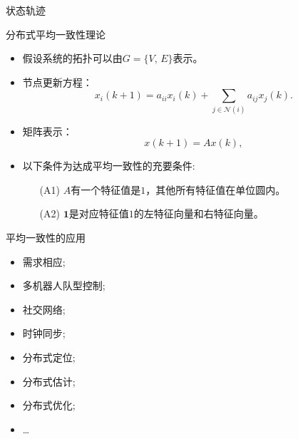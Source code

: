 \documentclass[10pt]{beamer}
\begin{document}
\begin{frame}{状态轨迹}
  \begin{figure}[ht]
    \centering
    
  \end{figure}
\end{frame}

\begin{frame}{分布式平均一致性理论}
  \begin{itemize}
  \item 假设系统的拓扑可以由$G = \{V,\,E\}$表示。
  \item 节点更新方程：
    \begin{displaymath}
      x_i(k+1) = a_{ii} x_{i}(k) + \sum_{j\in \mathcal N(i)} a_{ij} x_{j}(k).  
    \end{displaymath}
  \item 矩阵表示：
    \begin{displaymath}
      x(k+1) = A x(k),
    \end{displaymath}
  \item 以下条件为达成平均一致性的充要条件:
    \begin{enumerate}
    \item[(A1)] $A$有一个特征值是$1$，其他所有特征值在单位圆内。 
    \item[(A2)] $\mathbf 1$是对应特征值$1$的左特征向量和右特征向量。
    \end{enumerate}
  \end{itemize}
\end{frame}


\begin{frame}{平均一致性的应用}
  \begin{itemize}
  \item 需求相应;
  \item 多机器人队型控制;
  \item 社交网络;
  \item 时钟同步;
  \item 分布式定位;
  \item 分布式估计;
  \item 分布式优化;
  \item \dots
  \end{itemize}
\end{frame}
\end{document}
